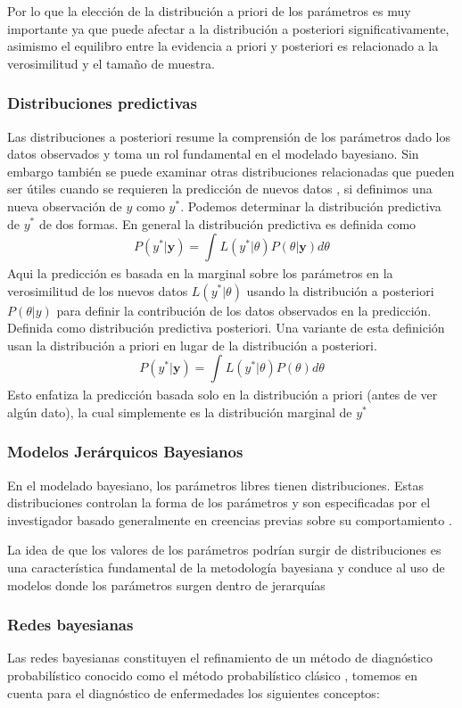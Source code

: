 Por lo que la elección de la distribución a priori de los parámetros es muy importante ya que puede afectar a la distribución a posteriori significativamente, asimismo el equilibro entre la evidencia a priori y posteriori es relacionado a la verosimilitud y el tamaño de muestra.

\subsubsection{Distribuciones predictivas}
Las distribuciones a posteriori resume la comprensión de los parámetros dado los datos observados y toma un rol fundamental en el modelado bayesiano. Sin embargo también se puede examinar otras distribuciones relacionadas que pueden ser útiles cuando se requieren la predicción de nuevos datos \parencite{lawson2018bayesian}, si definimos una nueva observación de $y$ como $y^*$. Podemos determinar la distribución predictiva de $y^*$ de dos formas. En general la distribución predictiva es definida como
$$
P(y^* | \mathbf{y}) = \int_{}^{} L(y^* | \theta)P(\theta | \mathbf{y})d\theta
$$
Aqui la predicción es basada en la marginal sobre los parámetros en la verosimilitud de los nuevos datos $L(y^* | \theta)$ usando la distribución a posteriori $P(\theta | y)$ para definir la contribución de los datos observados en la predicción. Definida como distribución predictiva posteriori. Una variante de esta definición usan la distribución a priori en lugar de la distribución a posteriori.
$$
P(y^* | \mathbf{y}) = \int_{}^{} L(y^* | \theta)P(\theta)d\theta
$$
Esto enfatiza la predicción basada solo en la distribución a priori (antes de ver algún dato), la cual simplemente es la distribución marginal de $y^*$

\subsubsection{Modelos Jerárquicos Bayesianos}
En el modelado bayesiano, los parámetros libres tienen distribuciones. Estas distribuciones controlan la forma de los parámetros y son especificadas por el investigador basado generalmente en creencias previas sobre su comportamiento \parencite{lawson2018bayesian}. 

La idea de que los valores de los parámetros podrían surgir de distribuciones es una característica fundamental de la metodología bayesiana y conduce al uso de modelos donde los parámetros surgen dentro de jerarquías

\subsubsection{Redes bayesianas}
Las redes bayesianas constituyen el refinamiento de un método de diagnóstico probabilístico conocido como el método probabilístico clásico \parencite{koski2011bayesian}, tomemos en cuenta para el diagnóstico de enfermedades los siguientes conceptos:

